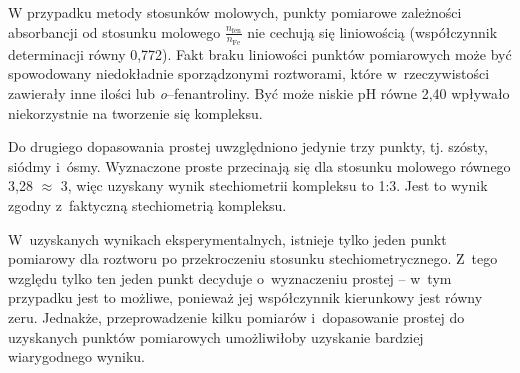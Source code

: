 \documentclass[12pt]{article}
\begin{document}
W przypadku metody stosunków molowych, punkty pomiarowe zależności absorbancji od stosunku molowego $\frac{n_{\mathrm{fen}}}{n_{\mathrm{Fe}}}$ nie cechują się liniowością (współczynnik determinacji równy 0,772). Fakt braku liniowości punktów pomiarowych może być spowodowany niedokładnie sporządzonymi roztworami, które w~rzeczywistości zawierały inne ilości  lub \textit{o}--fenantroliny. Być może niskie pH równe 2,40 wpływało niekorzystnie na tworzenie się kompleksu.

Do drugiego dopasowania prostej uwzględniono jedynie trzy punkty, tj. szósty, siódmy i~ósmy. Wyznaczone proste przecinają się dla stosunku molowego równego 3,28 $\approx$ 3, więc uzyskany wynik stechiometrii kompleksu to 1:3. Jest to wynik zgodny z~faktyczną stechiometrią kompleksu.

W~uzyskanych wynikach eksperymentalnych, istnieje tylko jeden punkt pomiarowy dla roztworu po przekroczeniu stosunku stechiometrycznego. Z~tego względu tylko ten jeden punkt decyduje o~wyznaczeniu prostej -- w~tym przypadku jest to możliwe, ponieważ jej współczynnik kierunkowy jest równy zeru. Jednakże, przeprowadzenie kilku pomiarów i~dopasowanie prostej do uzyskanych punktów pomiarowych umożliwiłoby uzyskanie bardziej wiarygodnego wyniku.



\end{document}
